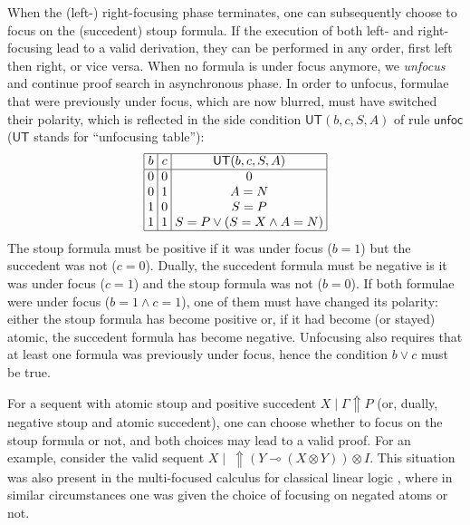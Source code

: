 \documentclass[runningheads]{llncs}
\newcommand{\ot}{\otimes}
\newcommand{\lolli}{\multimap}
\newcommand{\I}{\mathsf{I}}
\newcommand{\UT}{\mathsf{UT}}
\newcommand{\up}{\Uparrow}
\newcommand{\unfoc}{\mathsf{unfoc}}
\begin{document}
When the (left-) right-focusing phase terminates, one can subsequently choose to focus on the (succedent) stoup formula. If the execution of both left- and right-focusing lead to a valid derivation, they can be performed in any order, first left then right, or vice versa. When no formula is under focus anymore, we \emph{unfocus} and continue proof search in asynchronous phase. In order to unfocus, formulae that were previously under focus, which are now blurred, must have switched their polarity, which is reflected in the side condition $\UT(b,c,S,A)$ of rule $\unfoc$ ($\UT$ stands for ``unfocusing table''):
\[
\begin{array}{|@{\;}c@{\;}|@{\;}c@{\;}|@{\;}c@{\;}|}
  \hline
b & c & \UT(b,c,S,A) \\
\hline
0 & 0 & 0 \\
0 & 1 & A = N \\
1 & 0 & S = P \\
1 & 1 & S = P \vee (S = X \wedge A = N)\\
  \hline
\end{array}
\]
The stoup formula must be positive if it was under focus ($b=1$) but the succedent was not ($c=0$). Dually, the succedent formula must be negative is it was under focus ($c = 1$) and the stoup formula was not ($b = 0$). If both formulae were under focus ($b = 1 \wedge c = 1$), one of them must have changed its polarity: either the stoup formula has become positive or, if it had become (or stayed)  atomic, the succedent formula has become negative. Unfocusing also requires that at least one formula was previously under focus, hence the condition $b \vee c$ must be true.

For a sequent with atomic stoup and positive succedent $X \mid \Gamma \up P$ (or, dually, negative stoup and atomic succedent), one can choose whether to focus on the stoup formula or not, and both choices may lead to a valid proof. For an example, consider the valid sequent $X \mid ~ \up (Y \lolli (X \ot Y)) \ot I$. This situation was also present in the multi-focused calculus for classical linear logic \cite{chaudhuri:canonical:2008}, where in similar circumstances one was given the choice of focusing on negated atoms or not.
\end{document}
